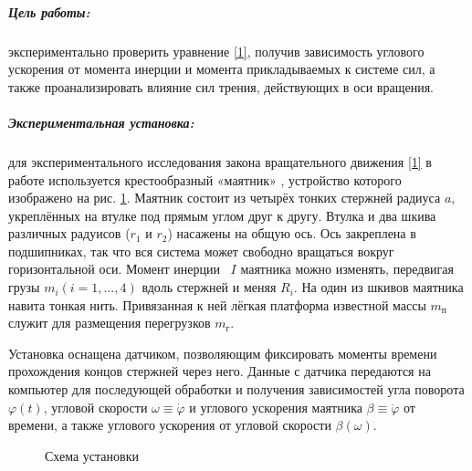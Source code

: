 \documentclass[a4paper,12pt]{article}
\begin{document}
\subparagraph*{Цель работы:} экспериментально проверить уравнение \eqref{1}, получив зависимость углового ускорения от момента инерции и момента прикладываемых к системе сил, а также проанализировать влияние сил трения, действующих в оси вращения.
\subparagraph*{Экспериментальная установка:} для экспериментального исследования закона вращательного движения \eqref{1} в работе используется крестообразный «маятник» ,  устройство которого изображено на рис. \ref{fig:image}. Маятник состоит из четырёх тонких стержней радиуса $a$, укреплённых на втулке под прямым углом друг к другу. Втулка и два шкива различных радуисов  ($r_1$ и $r_2$) насажены на общую ось. Ось закреплена в подшипниках, так что вся система может свободно вращаться вокруг горизонтальной оси. Момент инерции  {$I$} маятника можно изменять, передвигая грузы $m_i (i = 1, \dots, 4)$ вдоль стержней и меняя $R_i$. На один из шкивов маятника навита тонкая нить. Привязанная к ней лёгкая платформа известной массы $m_п$ служит для размещения перегрузков $m_г$. 

Установка оснащена датчиком, позволяющим фиксировать моменты времени прохождения концов стержней через него. Данные с датчика передаются на компьютер для последующей обработки и получения зависимостей угла поворота $\varphi(t)$, угловой скорости $\omega \equiv \dot{\varphi}$ и углового ускорения маятника $\beta \equiv \ddot{\varphi}$ от времени, а также углового ускорения от угловой скорости $\beta(\omega)$.

\begin{figure}[h]
	\caption{Схема установки}
	\label{fig:image}
\end{figure}
\end{document}
